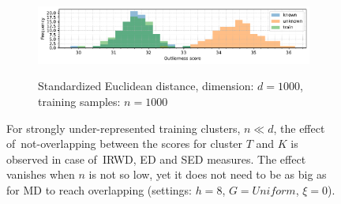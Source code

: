\begin{figure}[t]
\begin{subfigure}[b]{\textwidth}
        \centering
        \caption{\small Standardized Euclidean distance, dimension: $d = 1000$, training samples: $n = 1000$}
        \includegraphics[width=\textwidth]{images/distributions/hists-extreme/hist-distributions-dimension_1000-samples_1000-distance_8-distribution_uniform-model_SED-seed_0.pdf}
        \label{fig:hists-sed-n1000}
    \end{subfigure}
    \caption{For strongly under-represented training clusters, $n \ll d$, the effect of~not-overlapping between the scores for cluster $T$ and $K$ is observed in case of~IRWD, ED and SED measures. The effect vanishes when $n$ is not so low, yet it does not need to be as big as for MD to reach overlapping (settings: $h = 8$, $G = \textit{Uniform}$, $\xi = 0$).}
    \label{fig:hists-extreme-bad}
\end{figure}

